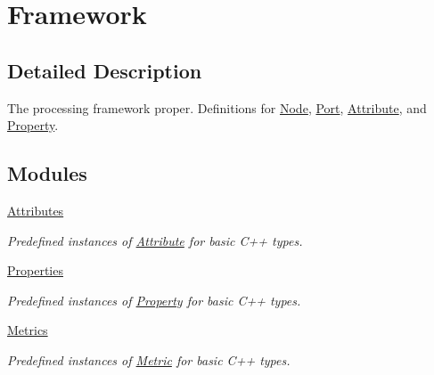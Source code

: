 \hypertarget{group___process_framework}{}\section{Framework}
\label{group___process_framework}


\subsection{Detailed Description}
The processing framework proper. Definitions for \hyperlink{classdg_1_1deepcore_1_1_node}{Node}, \hyperlink{classdg_1_1deepcore_1_1_port}{Port}, \hyperlink{classdg_1_1deepcore_1_1_attribute}{Attribute}, and \hyperlink{classdg_1_1deepcore_1_1_property}{Property}. 

\subsection*{Modules}
\begin{DoxyCompactItemize}
\item 
\hyperlink{group___process_attributes}{Attributes}
\begin{DoxyCompactList}\small\item\em Predefined instances of \hyperlink{classdg_1_1deepcore_1_1_attribute}{Attribute} for basic C++ types. \end{DoxyCompactList}\item 
\hyperlink{group___process_properties}{Properties}
\begin{DoxyCompactList}\small\item\em Predefined instances of \hyperlink{classdg_1_1deepcore_1_1_property}{Property} for basic C++ types. \end{DoxyCompactList}\item 
\hyperlink{group___process_metrics}{Metrics}
\begin{DoxyCompactList}\small\item\em Predefined instances of \hyperlink{classdg_1_1deepcore_1_1_metric}{Metric} for basic C++ types. \end{DoxyCompactList}\end{DoxyCompactItemize}
